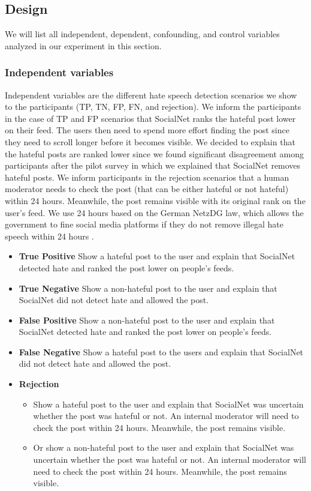 \subsection{Design}
We will list all independent, dependent, confounding, and control variables analyzed in our experiment in this section.

\subsubsection{Independent variables}
Independent variables are the different hate speech detection scenarios we show to the participants (TP, TN, FP, FN, and rejection).
%
We inform the participants in the case of TP and FP scenarios that SocialNet ranks the hateful post lower on their feed.
%
The users then need to spend more effort finding the post since they need to scroll longer before it becomes visible.
%
We decided to explain that the hateful posts are ranked lower since we found significant disagreement among participants after the pilot survey in which we explained that SocialNet removes hateful posts.
%
We inform participants in the rejection scenarios that a human moderator needs to check the post (that can be either hateful or not hateful) within 24 hours.
%
Meanwhile, the post remains visible with its original rank on the user's feed.
%
We use 24 hours based on the German NetzDG law, which allows the government to fine social media platforms if they do not remove illegal hate speech within 24 hours \citep{tworek2019analysis}.
%
\begin{itemize}
    \item \textbf{True Positive} Show a hateful post to the user and explain that SocialNet detected hate and ranked the post lower on people's feeds.
    \item \textbf{True Negative} Show a non-hateful post to the user and explain that SocialNet did not detect hate and allowed the post.
    \item \textbf{False Positive} Show a non-hateful post to the user and explain that SocialNet detected hate and ranked the post lower on people's feeds.
    \item \textbf{False Negative} Show a hateful post to the users and explain that SocialNet did not detect hate and allowed the post.
    \item \textbf{Rejection}
          \begin{itemize}
              \item Show a hateful post to the user and explain that SocialNet was uncertain whether the post was hateful or not. An internal moderator will need to check the post within 24 hours. Meanwhile, the post remains visible.
              \item Or show a non-hateful post to the user and explain that SocialNet was uncertain whether the post was hateful or not. An internal moderator will need to check the post within 24 hours. Meanwhile, the post remains visible.
          \end{itemize}
\end{itemize}

